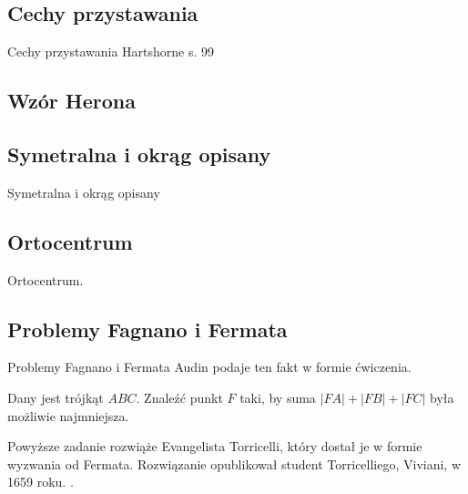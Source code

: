 

\subsection{Cechy przystawania}
Cechy przystawania
\loremipsum
Hartshorne s. 99







\subsection{Wzór Herona}


\subsection{Symetralna i okrąg opisany}
Symetralna i okrąg opisany
\loremipsum

\subsection{Ortocentrum}
Ortocentrum.
\loremipsum

\subsection{Problemy Fagnano i Fermata}
Problemy Fagnano i Fermata %
Audin \cite[s. 101]{audin_2003} podaje ten fakt w formie ćwiczenia.

\begin{problem}
	Dany jest trójkąt $ABC$.
	Znaleźć punkt $F$ taki, by suma $|FA| + |FB| + |FC|$ była możliwie najmniejsza.
%
\end{problem}

Powyższe zadanie rozwiąże Evangelista Torricelli, który dostał je w formie wyzwania od Fermata.
%
Rozwiązanie opublikował student Torricelliego, Viviani, w 1659 roku.
. %

